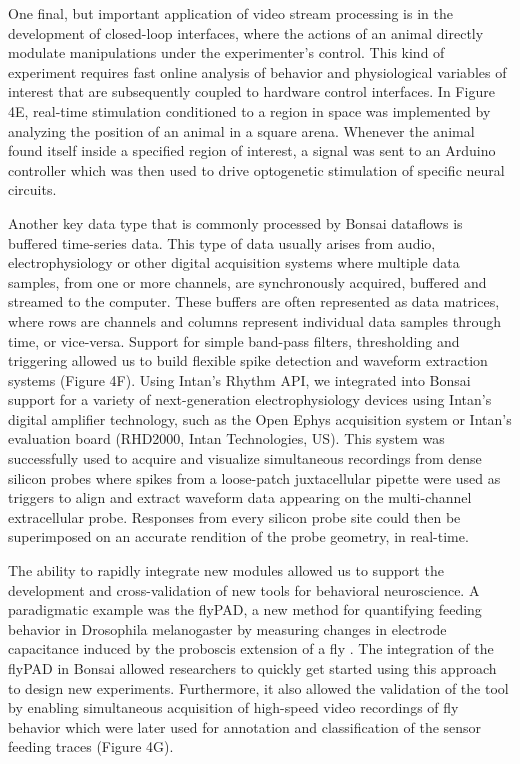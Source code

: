 One final, but important application of video stream processing is in the development of closed-loop interfaces, where the actions of an animal directly modulate manipulations under the experimenter's control. This kind of experiment requires fast online analysis of behavior and physiological variables of interest that are subsequently coupled to hardware control interfaces. In Figure 4E, real-time stimulation conditioned to a region in space was implemented by analyzing the position of an animal in a square arena. Whenever the animal found itself inside a specified region of interest, a signal was sent to an Arduino controller which was then used to drive optogenetic stimulation of specific neural circuits.

Another key data type that is commonly processed by Bonsai dataflows is buffered time-series data. This type of data usually arises from audio, electrophysiology or other digital acquisition systems where multiple data samples, from one or more channels, are synchronously acquired, buffered and streamed to the computer. These buffers are often represented as data matrices, where rows are channels and columns represent individual data samples through time, or vice-versa. Support for simple band-pass filters, thresholding and triggering allowed us to build flexible spike detection and waveform extraction systems (Figure 4F). Using Intan's Rhythm API, we integrated into Bonsai support for a variety of next-generation electrophysiology devices using Intan's digital amplifier technology, such as the Open Ephys acquisition system \cite{Voigts2013} or Intan's evaluation board (RHD2000, Intan Technologies, US). This system was successfully used to acquire and visualize simultaneous recordings from dense silicon probes where spikes from a loose-patch juxtacellular pipette were used as triggers to align and extract waveform data appearing on the multi-channel extracellular probe. Responses from every silicon probe site could then be superimposed on an accurate rendition of the probe geometry, in real-time.

The ability to rapidly integrate new modules allowed us to support the development and cross-validation of new tools for behavioral neuroscience. A paradigmatic example was the flyPAD, a new method for quantifying feeding behavior in Drosophila melanogaster by measuring changes in electrode capacitance induced by the proboscis extension of a fly \cite{Itskov2014}. The integration of the flyPAD in Bonsai allowed researchers to quickly get started using this approach to design new experiments. Furthermore, it also allowed the validation of the tool by enabling simultaneous acquisition of high-speed video recordings of fly behavior which were later used for annotation and classification of the sensor feeding traces (Figure 4G).

